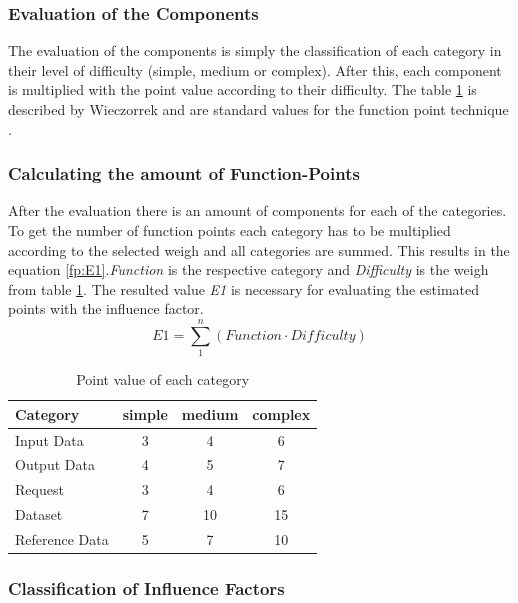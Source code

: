 \subsubsection{Evaluation of the Components}

The evaluation of the components is simply the classification of each category in their level of difficulty (simple, medium or complex). After this, each component is multiplied with the point value according to their difficulty. The table \ref{tab:pointvalues} is described by Wieczorrek and are standard values for the function point technique \cite{fpafundamentals}.

\subsubsection{ Calculating the amount of Function-Points}

After the evaluation there is an amount of components for each of the categories. To get the number of function points each category has to be multiplied according to the selected weigh and all categories are summed. This results in the equation \ref{fp:E1}.\textit{Function} is the respective category and \textit{Difficulty} is the weigh from table \ref{tab:pointvalues}. The resulted value \textit{E1} is necessary for evaluating the estimated points with the influence factor.
\begin{equation}
	\textit{E1} =  \sum \limits_{1}^n  (\textit{Function} \cdot \textit{Difficulty}) \label{fp:E1}
\end{equation}
\begin{table}[h] 
	\centering 
	\setlength{\tabcolsep}{4pt}
	\begin{tabular}{|l|c|c|c|}\hline
		Category & simple & medium & complex \\ \hline
		Input Data & 3 & 4 & 6\\ \hline
		Output Data & 4 & 5 & 7\\ \hline
		Request & 3 & 4 & 6\\ \hline
		Dataset & 7 & 10 & 15\\ \hline
		Reference Data & 5 & 7 & 10\\ \hline
	\end{tabular}
	\caption{Point value of each category} 
	\label{tab:pointvalues} 
\end{table}
\subsubsection{ Classification of Influence Factors}\label{fp:classificationInfluence}

